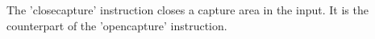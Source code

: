 The 'closecapture' instruction closes a capture area in the input.
It is the counterpart of the 'opencapture' instruction.
